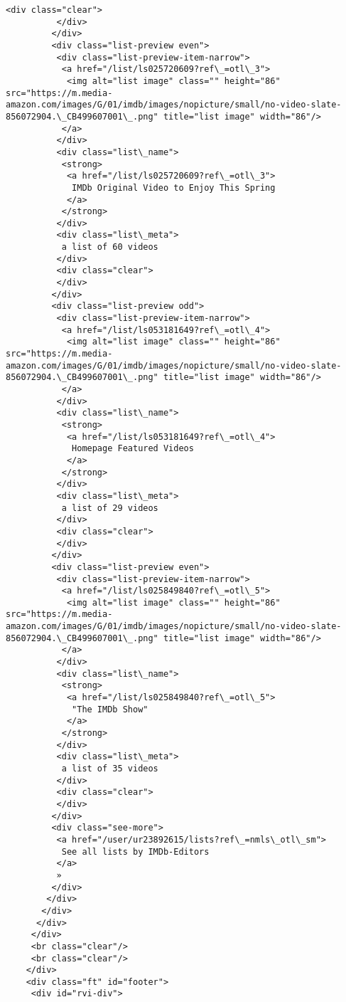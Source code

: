 \documentclass[11pt]{article}
\begin{document}
\begin{Verbatim}[commandchars=\\\{\}]
          <div class="clear">
          </div>
         </div>
         <div class="list-preview even">
          <div class="list-preview-item-narrow">
           <a href="/list/ls025720609?ref\_=otl\_3">
            <img alt="list image" class="" height="86" src="https://m.media-amazon.com/images/G/01/imdb/images/nopicture/small/no-video-slate-856072904.\_CB499607001\_.png" title="list image" width="86"/>
           </a>
          </div>
          <div class="list\_name">
           <strong>
            <a href="/list/ls025720609?ref\_=otl\_3">
             IMDb Original Video to Enjoy This Spring
            </a>
           </strong>
          </div>
          <div class="list\_meta">
           a list of 60 videos
          </div>
          <div class="clear">
          </div>
         </div>
         <div class="list-preview odd">
          <div class="list-preview-item-narrow">
           <a href="/list/ls053181649?ref\_=otl\_4">
            <img alt="list image" class="" height="86" src="https://m.media-amazon.com/images/G/01/imdb/images/nopicture/small/no-video-slate-856072904.\_CB499607001\_.png" title="list image" width="86"/>
           </a>
          </div>
          <div class="list\_name">
           <strong>
            <a href="/list/ls053181649?ref\_=otl\_4">
             Homepage Featured Videos
            </a>
           </strong>
          </div>
          <div class="list\_meta">
           a list of 29 videos
          </div>
          <div class="clear">
          </div>
         </div>
         <div class="list-preview even">
          <div class="list-preview-item-narrow">
           <a href="/list/ls025849840?ref\_=otl\_5">
            <img alt="list image" class="" height="86" src="https://m.media-amazon.com/images/G/01/imdb/images/nopicture/small/no-video-slate-856072904.\_CB499607001\_.png" title="list image" width="86"/>
           </a>
          </div>
          <div class="list\_name">
           <strong>
            <a href="/list/ls025849840?ref\_=otl\_5">
             "The IMDb Show"
            </a>
           </strong>
          </div>
          <div class="list\_meta">
           a list of 35 videos
          </div>
          <div class="clear">
          </div>
         </div>
         <div class="see-more">
          <a href="/user/ur23892615/lists?ref\_=nmls\_otl\_sm">
           See all lists by IMDb-Editors
          </a>
          »
         </div>
        </div>
       </div>
      </div>
     </div>
     <br class="clear"/>
     <br class="clear"/>
    </div>
    <div class="ft" id="footer">
     <div id="rvi-div">

\end{Verbatim}
\end{document}
